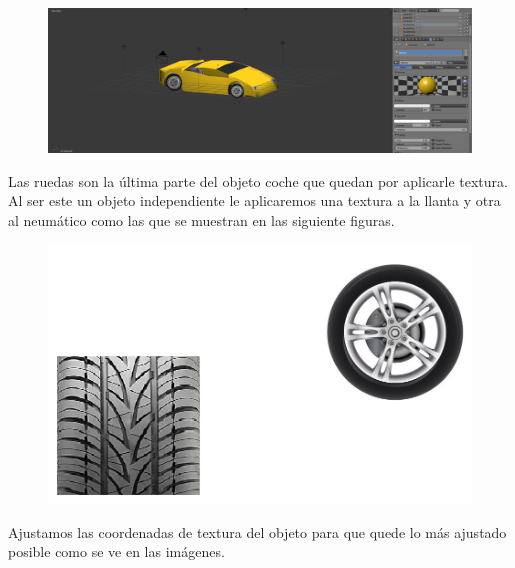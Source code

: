 \documentclass[10pt]{article}
\begin{document}
\begin{figure}[H]
	\begin{center}
	 		\includegraphics[width = 1.00\textwidth]{Imagenes/p3-img24}
	\end{center} 
\end{figure}

Las ruedas son la última parte del objeto coche que quedan por aplicarle textura. Al ser este un objeto independiente le aplicaremos una textura a la llanta y otra al neumático como las que se muestran en las siguiente figuras. \\

\begin{figure}[H]
	\begin{center}
	 		\includegraphics[width = 1.00\textwidth]{Imagenes/p3-img20}
	\end{center} 
\end{figure}

Ajustamos las coordenadas de textura del objeto para que quede lo más ajustado posible como se ve en las imágenes. \\
\end{document}
